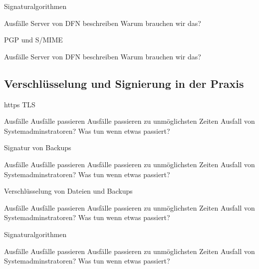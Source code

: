 \documentclass[10pt]{beamer}
\begin{document}
\begin{frame}[fragile]{Signaturalgorithmen}
\begin{alertblock}{Ausfälle}
Server von DFN beschreiben
Warum brauchen wir das?
\end{alertblock}
\end{frame}

\begin{frame}[fragile]{PGP und S/MIME}
\begin{alertblock}{Ausfälle}
	Server von DFN beschreiben
	Warum brauchen wir das?
\end{alertblock}
\end{frame}

\subsection{Verschlüsselung und Signierung in der Praxis}

\begin{frame}[fragile]{https TLS}
\begin{alertblock}{Ausfälle}
	Ausfälle passieren
	Ausfälle passieren zu unmöglichsten Zeiten
	Ausfall von Systemadminstratoren?
	Was tun wenn etwas passiert?
\end{alertblock}
\end{frame}

\begin{frame}[fragile]{Signatur von Backups}
\begin{alertblock}{Ausfälle}
	Ausfälle passieren
	Ausfälle passieren zu unmöglichsten Zeiten
	Ausfall von Systemadminstratoren?
	Was tun wenn etwas passiert?
\end{alertblock}
\end{frame}

\begin{frame}[fragile]{Verschlüsselung von Dateien und Backups}
\begin{alertblock}{Ausfälle}
	Ausfälle passieren
	Ausfälle passieren zu unmöglichsten Zeiten
	Ausfall von Systemadminstratoren?
	Was tun wenn etwas passiert?
\end{alertblock}
\end{frame}

\begin{frame}[fragile]{Signaturalgorithmen}
\begin{alertblock}{Ausfälle}
	Ausfälle passieren
	Ausfälle passieren zu unmöglichsten Zeiten
	Ausfall von Systemadminstratoren?
	Was tun wenn etwas passiert?
\end{alertblock}
\end{frame}
\end{document}
